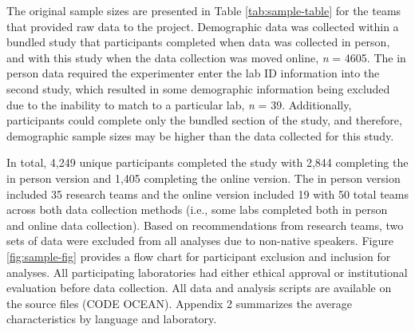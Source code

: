 \documentclass[
  man]{apa7}
\begin{document}
The original sample sizes are presented in Table \ref{tab:sample-table} for the teams that provided raw data to the project. Demographic data was collected within a bundled study that participants completed when data was collected in person, and with this study when the data collection was moved online, \emph{n} = 4605. The in person data required the experimenter enter the lab ID information into the second study, which resulted in some demographic information being excluded due to the inability to match to a particular lab, \emph{n} = 39. Additionally, participants could complete only the bundled section of the study, and therefore, demographic sample sizes may be higher than the data collected for this study.

In total, 4,249 unique participants completed the study with 2,844 completing the in person version and 1,405 completing the online version. The in person version included 35 research teams and the online version included 19 with 50 total teams across both data collection methods (i.e., some labs completed both in person and online data collection). Based on recommendations from research teams, two sets of data were excluded from all analyses due to non-native speakers. Figure \ref{fig:sample-fig} provides a flow chart for participant exclusion and inclusion for analyses. All participating laboratories had either ethical approval or institutional evaluation before data collection. All data and analysis scripts are available on the source files (CODE OCEAN). Appendix 2 summarizes the average characteristics by language and laboratory.
\end{document}
